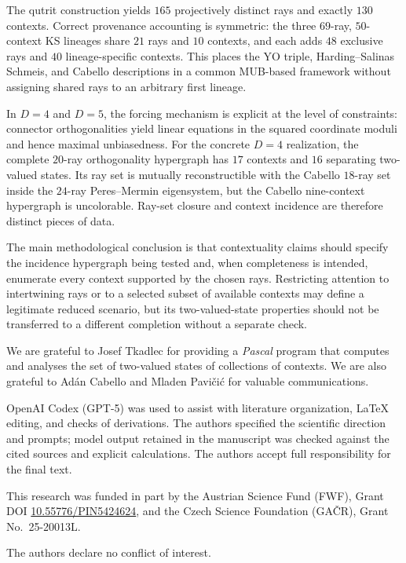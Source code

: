 \documentclass[%
  reprint,
  superscriptaddress,
  showpacs,
  showkeys,
  amsmath,amssymb,
  pra,
  longbibliography,
  floatfix,
  x11names
]{revtex4-2}
\newcommand{\rev}[1]{{\color{revisionblue}#1}}
\newenvironment{revision}{\begingroup\color{revisionblue}}{\endgroup}
\begin{document}
\begin{revision}
The qutrit construction yields $165$ projectively distinct rays and exactly $130$ contexts.  Correct provenance accounting is symmetric: the three $69$-ray, $50$-context KS lineages share $21$ rays and $10$ contexts, and each adds $48$ exclusive rays and $40$ lineage-specific contexts.  This places the YO triple, Harding--Salinas Schmeis, and Cabello descriptions in a common MUB-based framework without assigning shared rays to an arbitrary first lineage.

In $D=4$ and $D=5$, the forcing mechanism is explicit at the level of constraints: connector orthogonalities yield linear equations in the squared coordinate moduli and hence maximal unbiasedness.  For the concrete $D=4$ realization, the complete $20$-ray orthogonality hypergraph has $17$ contexts and $16$ separating two-valued states.  Its ray set is mutually reconstructible with the Cabello $18$-ray set inside the $24$-ray Peres--Mermin eigensystem, but the Cabello nine-context hypergraph is uncolorable.  Ray-set closure and context incidence are therefore distinct pieces of data.

The main methodological conclusion is that contextuality claims should specify the incidence hypergraph being tested and, when completeness is intended, enumerate every context supported by the chosen rays.  Restricting attention to intertwining rays or to a selected subset of available contexts may define a legitimate reduced scenario, but its two-valued-state properties should not be transferred to a different completion without a separate check.
\end{revision}

\begin{acknowledgments}
We are grateful to Josef Tkadlec for providing a {\em Pascal} program that computes and analyses the set of two-valued states of collections of contexts.
We are also grateful to Ad\'{a}n Cabello and Mladen Pavi{\v{c}}i{\'{c}} for valuable communications.

\rev{OpenAI Codex (GPT-5) was used to assist with literature organization, \LaTeX{}
editing, and checks of derivations.  The authors %
specified the scientific
direction and prompts; model output retained in the manuscript was checked
against the cited sources and explicit calculations.  The authors accept %
full
responsibility for the final text.}

This research was funded in part by the Austrian
Science Fund (FWF), Grant DOI \href{https://doi.org/10.55776/PIN5424624}{10.55776/PIN5424624}, 
and the Czech Science
Foundation (GA\v{C}R), Grant No.~25-20013L.

The authors declare no conflict of interest.
\end{acknowledgments}
\end{document}
